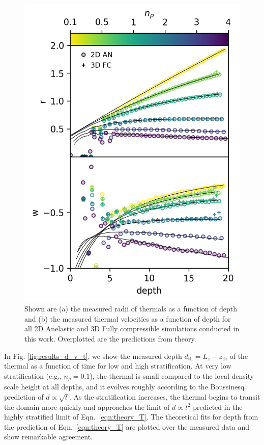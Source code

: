 \documentclass[twocolumn, amsmath, amsfonts, amssymb, trackchanges]{aastex62}
\begin{document}
\begin{figure}[t!]
    \includegraphics[width=\columnwidth]{results_panels_vs_depth.png}
    \caption{
	Shown are (a) the measured radii of thermals as a function of depth and (b) the measured thermal velocities as a function of depth for all 2D Anelastic and 3D Fully compressible simulations conducted in this work. 
	Overplotted are the predictions from theory.
    \label{fig:results_vs_depth} }
\end{figure}

In Fig. \ref{fig:results_d_v_t}, we show the measured depth $d_{\text{th}} = L_z - z_{\text{th}}$ of the thermal as a function of time for low and high stratification. 
At very low stratification (e.g., $n_\rho = 0.1$), the thermal is small compared to the local density scale height at all depths, and it evolves roughly according to the Boussinesq prediction of $d \propto \sqrt{t}$. 
As the stratification increases, the thermal begins to transit the domain more quickly and approaches the limit of $d \propto t^2$ predicted in the highly stratified limit of Eqn.~\ref{eqn:theory_T}. 
The theoretical fits for depth from the prediction of Eqn.~\ref{eqn:theory_T} are plotted over the measured data and show remarkable agreement.
\end{document}
